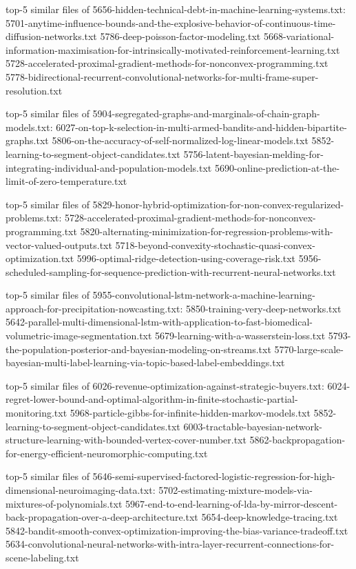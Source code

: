 \documentclass[11pt]{article}
\begin{document}
top-5 similar files of
5656-hidden-technical-debt-in-machine-learning-systems.txt:
5701-anytime-influence-bounds-and-the-explosive-behavior-of-continuous-time-diffusion-networks.txt
5786-deep-poisson-factor-modeling.txt
5668-variational-information-maximisation-for-intrinsically-motivated-reinforcement-learning.txt
5728-accelerated-proximal-gradient-methods-for-nonconvex-programming.txt
5778-bidirectional-recurrent-convolutional-networks-for-multi-frame-super-resolution.txt

top-5 similar files of
5904-segregated-graphs-and-marginals-of-chain-graph-models.txt:
6027-on-top-k-selection-in-multi-armed-bandits-and-hidden-bipartite-graphs.txt
5806-on-the-accuracy-of-self-normalized-log-linear-models.txt
5852-learning-to-segment-object-candidates.txt
5756-latent-bayesian-melding-for-integrating-individual-and-population-models.txt
5690-online-prediction-at-the-limit-of-zero-temperature.txt

top-5 similar files of
5829-honor-hybrid-optimization-for-non-convex-regularized-problems.txt:
5728-accelerated-proximal-gradient-methods-for-nonconvex-programming.txt
5820-alternating-minimization-for-regression-problems-with-vector-valued-outputs.txt
5718-beyond-convexity-stochastic-quasi-convex-optimization.txt
5996-optimal-ridge-detection-using-coverage-risk.txt
5956-scheduled-sampling-for-sequence-prediction-with-recurrent-neural-networks.txt

top-5 similar files of
5955-convolutional-lstm-network-a-machine-learning-approach-for-precipitation-nowcasting.txt:
5850-training-very-deep-networks.txt
5642-parallel-multi-dimensional-lstm-with-application-to-fast-biomedical-volumetric-image-segmentation.txt
5679-learning-with-a-wasserstein-loss.txt
5793-the-population-posterior-and-bayesian-modeling-on-streams.txt
5770-large-scale-bayesian-multi-label-learning-via-topic-based-label-embeddings.txt

top-5 similar files of
6026-revenue-optimization-against-strategic-buyers.txt:
6024-regret-lower-bound-and-optimal-algorithm-in-finite-stochastic-partial-monitoring.txt
5968-particle-gibbs-for-infinite-hidden-markov-models.txt
5852-learning-to-segment-object-candidates.txt
6003-tractable-bayesian-network-structure-learning-with-bounded-vertex-cover-number.txt
5862-backpropagation-for-energy-efficient-neuromorphic-computing.txt

top-5 similar files of
5646-semi-supervised-factored-logistic-regression-for-high-dimensional-neuroimaging-data.txt:
5702-estimating-mixture-models-via-mixtures-of-polynomials.txt
5967-end-to-end-learning-of-lda-by-mirror-descent-back-propagation-over-a-deep-architecture.txt
5654-deep-knowledge-tracing.txt
5842-bandit-smooth-convex-optimization-improving-the-bias-variance-tradeoff.txt
5634-convolutional-neural-networks-with-intra-layer-recurrent-connections-for-scene-labeling.txt
\end{document}
